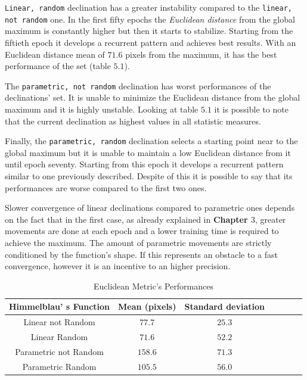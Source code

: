 {\tt Linear, random} declination has a greater instability compared to the {\tt linear, not random} one. In the first fifty epochs the \textit{Euclidean distance} from the global maximum is constantly higher but then it starts to stabilize. Starting from the fiftieth epoch it develops a recurrent pattern and achieves best results. With an Euclidean distance mean of $71.6$ pixels from the maximum, it has the best performance of the set (table $5.1$).

The {\tt parametric, not random} declination has worst performances of the declinations' set. It is unable to minimize the Euclidean distance from the global maximum and it is highly unstable. Looking at table $5.1$ it is possible to note that the current declination as highest values in all statistic measures.

Finally, the {\tt parametric, random} declination selects a starting point near to the global maximum but it is unable to maintain a low Euclidean distance from it until epoch seventy. Starting from this epoch it develops a recurrent pattern similar to one previously described. Despite of this it is possible to say that its performances are worse compared to the first two ones.

Slower convergence of linear declinations compared to parametric ones depends on the fact that in the first case, as already explained in \textbf{Chapter $3$}, greater movements are done at each epoch and a lower training time is required to achieve the maximum. The amount of parametric movements are strictly conditioned by the function's shape. If this represents an obstacle to a fast convergence, however it is an incentive to an higher precision. \\

\begin{table} [h!]
	\centering
	\resizebox{\linewidth}{!} {
	\begin{tabular}{c| cccccc}
		\hline \textbf{Himmelblau' s Function}
		& \textbf{Mean (pixels)} & \textbf{Standard deviation}  \\ 
		\hline Linear not Random
		& $77.7$ &\cellcolor{red!25}$25.3$ \\ 
		\hline Linear Random
		& \cellcolor{red!25}$71.6$ & $52.2$ \\ 
		\hline Parametric not Random
		& $158.6$ & $71.3$ \\ 
		\hline Parametric Random
		& $105.5$ & $56.0$ \\ 
		\hline 
	\end{tabular}
}
\label{tab:HimmelblauTabEuclidean}
\caption{Euclidean Metric's Performances}
\end{table}

